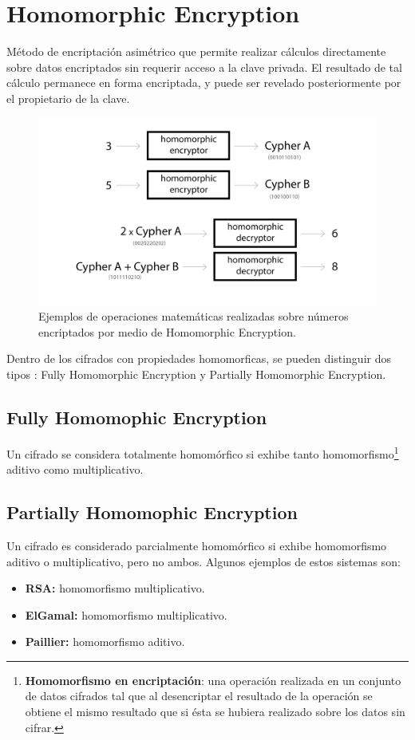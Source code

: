 \documentclass[
11pt, %
oneside, %
spanish, %
singlespacing, %
parskip, %
headsepline, %
chapterinoneline, %
]{MastersDoctoralThesis} %
\begin{document}
\pagebreak

\section{Homomorphic Encryption}
\cite{homenc} Método de encriptación asimétrico que permite realizar cálculos directamente sobre datos encriptados sin requerir acceso a la clave privada. El resultado de tal cálculo permanece en forma encriptada, y puede ser revelado posteriormente por el propietario de la clave.

\begin{figure}[H]
  	\centering
	\includegraphics[scale=0.5]{imgs/he.png}
	\caption{\cite{he} Ejemplos de operaciones matemáticas realizadas sobre números encriptados por medio de Homomorphic Encryption.}
\end{figure}

Dentro de los cifrados con propiedades homomorficas, se pueden distinguir dos tipos \cite{homenc1} \cite{homenc2}: Fully Homomorphic Encryption y Partially Homomorphic Encryption.

\subsection*{Fully Homomophic Encryption}
Un cifrado se considera totalmente homomórfico si exhibe tanto homomorfismo\footnote{\textbf{Homomorfismo en encriptación}: una operación realizada en un conjunto de datos cifrados tal que al desencriptar el resultado de la operación se obtiene el mismo resultado que si ésta se hubiera realizado sobre los datos sin cifrar.} aditivo como multiplicativo.

\subsection*{Partially Homomophic Encryption}
Un cifrado es considerado parcialmente homomórfico si exhibe homomorfismo aditivo o multiplicativo, pero no ambos. Algunos ejemplos de estos sistemas son:
\begin{itemize}
\item \textbf{RSA:} homomorfismo multiplicativo. 
\item \textbf{ElGamal:} homomorfismo multiplicativo.
\item \textbf{Paillier:} homomorfismo aditivo.
\end{itemize}
\end{document}

